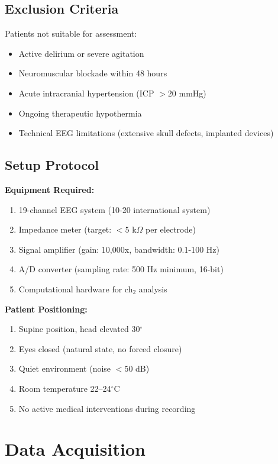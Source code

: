 \subsection{Exclusion Criteria}

Patients not suitable for assessment:
\begin{itemize}
\item Active delirium or severe agitation
\item Neuromuscular blockade within 48 hours
\item Acute intracranial hypertension (ICP $> 20$ mmHg)
\item Ongoing therapeutic hypothermia
\item Technical EEG limitations (extensive skull defects, implanted devices)
\end{itemize}

\subsection{Setup Protocol}

\textbf{Equipment Required:}
\begin{enumerate}
\item 19-channel EEG system (10-20 international system)
\item Impedance meter (target: $< 5$ k$\Omega$ per electrode)
\item Signal amplifier (gain: 10,000x, bandwidth: 0.1-100 Hz)
\item A/D converter (sampling rate: 500 Hz minimum, 16-bit)
\item Computational hardware for ch$_2$ analysis
\end{enumerate}

\textbf{Patient Positioning:}
\begin{enumerate}
\item Supine position, head elevated 30$^\circ$
\item Eyes closed (natural state, no forced closure)
\item Quiet environment (noise $< 50$ dB)
\item Room temperature 22--24$^\circ$C
\item No active medical interventions during recording
\end{enumerate}

\section{Data Acquisition}

